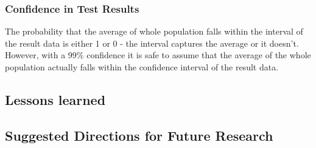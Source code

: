  \subsubsection{Confidence in Test Results}
The probability that the average of whole population falls within the interval of the result data is either 1 or 0 - the interval captures the average or it doesn't\cite{gunnar}. However, with a 99\% confidence it is safe to assume that the average of the whole population actually falls within the confidence interval of the result data. 


\subsection{Lessons learned}
\subsection{Suggested Directions for Future Research}